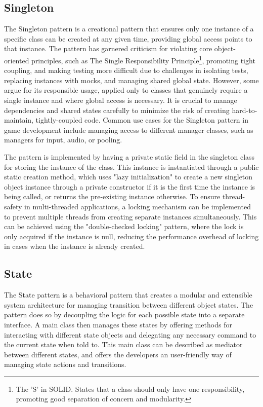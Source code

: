 \subsection{Singleton}
    The Singleton pattern is a creational pattern that ensures only one instance of a specific class can be created at any given time, providing global access points to that instance\cite{refactoringguru-singleton}. The pattern has garnered criticism for violating core object-oriented principles, such as The Single Responsibility Principle\footnote{The 'S' in SOLID. States that a class should only have one responsibility, promoting good separation of concern and modularity.}, promoting tight coupling, and making testing more difficult due to challenges in isolating tests, replacing instances with mocks, and managing shared global state. However, some argue for its responsible usage, applied only to classes that genuinely require a single instance and where global access is necessary. It is crucial to manage dependencies and shared states carefully to minimize the risk of creating hard-to-maintain, tightly-coupled code. Common use cases for the Singleton pattern in game development include managing access to different manager classes, such as managers for input, audio, or pooling.

    The pattern is implemented by having a private static field in the singleton class for storing the instance of the class. This instance is instantiated through a public static creation method, which uses "lazy initialization" to create a new singleton object instance through a private constructor if it is the first time the instance is being called, or returns the pre-existing instance otherwise. To ensure thread-safety in multi-threaded applications, a locking mechanism can be implemented to prevent multiple threads from creating separate instances simultaneously. This can be achieved using the "double-checked locking" pattern, where the lock is only acquired if the instance is null, reducing the performance overhead of locking in cases when the instance is already created.

\subsection{State}
    The State pattern is a behavioral pattern that creates a modular and extensible system architecture for managing transition between different object states\cite{gameprogpatterns-state}. The pattern does so by decoupling the logic for each possible state into a separate interface. A main class then manages these states by offering methods for interacting with different state objects and delegating any necessary command to the current state when told to. This main class can be described as mediator between different states, and offers the developers an user-friendly way of managing state actions and transitions.

